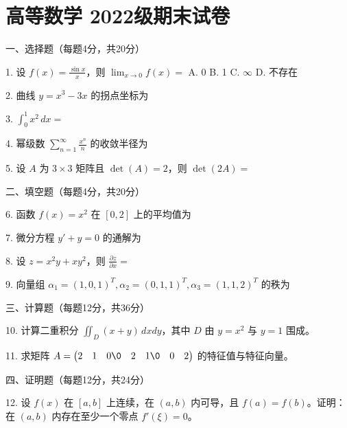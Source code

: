 \documentclass{article}
\begin{document}
\section*{高等数学 2022级期末试卷}

一、选择题（每题4分，共20分）

1. 设 $f(x)=\frac{\sin x}{x}$，则 $\lim_{x\to 0}f(x)=$ 
   A. 0 \quad B. 1 \quad C. $\infty$ \quad D. 不存在

2. 曲线 $y=x^3-3x$ 的拐点坐标为 

3. $\int_0^1 x^2\,dx =$ 

4. 幂级数 $\sum_{n=1}^{\infty}\frac{x^n}{n}$ 的收敛半径为 

5. 设 $A$ 为 $3\times 3$ 矩阵且 $\det(A)=2$，则 $\det(2A)=$ 

二、填空题（每题4分，共20分）

6. 函数 $f(x)=x^2$ 在 $[0,2]$ 上的平均值为 

7. 微分方程 $y'+y=0$ 的通解为 

8. 设 $z=x^2y+xy^2$，则 $\frac{\partial z}{\partial x}=$ 

9. 向量组 $\alpha_1=(1,0,1)^T,\alpha_2=(0,1,1)^T,\alpha_3=(1,1,2)^T$ 的秩为 

三、计算题（每题12分，共36分）

10. 计算二重积分 $\iint_D (x+y)\,dxdy$，其中 $D$ 由 $y=x^2$ 与 $y=1$ 围成。

11. 求矩阵 $A=\begin{pmatrix}2&1&0\0&2&1\0&0&2\end{pmatrix}$ 的特征值与特征向量。

四、证明题（每题12分，共24分）

12. 设 $f(x)$ 在 $[a,b]$ 上连续，在 $(a,b)$ 内可导，且 $f(a)=f(b)$。证明：在 $(a,b)$ 内存在至少一个零点 $f'(\xi)=0$。
\end{document}

